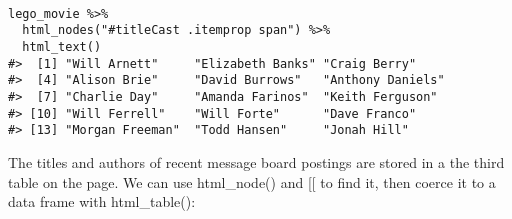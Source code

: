 \begin{frame}
\begin{framed}
\begin{verbatim}

lego_movie %>%
  html_nodes("#titleCast .itemprop span") %>%
  html_text()
#>  [1] "Will Arnett"     "Elizabeth Banks" "Craig Berry"    
#>  [4] "Alison Brie"     "David Burrows"   "Anthony Daniels"
#>  [7] "Charlie Day"     "Amanda Farinos"  "Keith Ferguson" 
#> [10] "Will Ferrell"    "Will Forte"      "Dave Franco"    
#> [13] "Morgan Freeman"  "Todd Hansen"     "Jonah Hill"
\end{verbatim}
\end{framed}
The titles and authors of recent message board postings are stored in a the third table on the page. We can use html_node() and [[ to find it, then coerce it to a data frame with html_table():
\end{frame}

